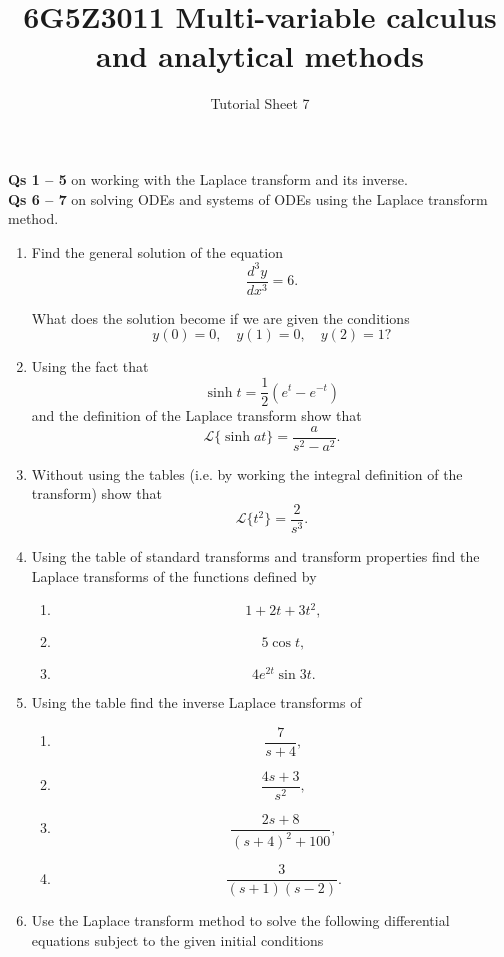 \documentclass[a4paper]{amsart}
\newcommand{\laplace}[1]{\mathcal{L}\{#1\}}
\begin{document}
\title{6G5Z3011 Multi-variable calculus and analytical methods}
\author{Tutorial Sheet 7}
\maketitle

\textbf{Qs 1 -- 5} on working with the Laplace transform and its inverse. \\
\textbf{Qs 6 -- 7} on solving ODEs and systems of ODEs using the Laplace transform method. 
\begin{enumerate}
    \item 
    Find the general solution of the equation
    $$ \frac{d^3y}{dx^3} = 6 .$$
    
    What does the solution become if we are given the conditions 
    $$y(0)=0, \quad y(1)=0, \quad y(2)=1 ?$$
    
    \item
    Using the fact that 
    $$ \sinh{t} = \frac{1}{2} \left ( e^t -e^{-t} \right ) $$
    and the definition of the Laplace transform show that
    $$\laplace{\sinh{at}}  = \frac{a}{s^2 - a^2} .$$
    
    \item
    Without using the tables (i.e. by working the integral definition of the transform) show that 
    $$ \laplace{ t^2 } = \dfrac{2}{s^3}.$$
    
    \item
    Using the table of standard transforms and transform properties find the Laplace transforms of the functions defined by
    \begin{enumerate}
    \item
    $$1 + 2t + 3t^2 ,$$
    \item
    $$5\cos{t} ,$$
    \item
    $$4e^{2t}\sin{3t} .$$
    \end{enumerate}
    
    \item
    Using the table find the inverse Laplace transforms of
    \begin{enumerate}
    \item
    $$\dfrac{7}{s+4} ,$$
    \item
    $$\dfrac{4s + 3}{s^2} ,$$
    \item
    $$\dfrac{2s+8}{(s+4)^2 + 100} ,$$
    \item
    $$\dfrac{3}{(s+1)(s-2)} .$$
    \end{enumerate}
    \item
Use the Laplace transform method to solve the following differential equations subject to the given initial conditions


\end{enumerate}
\end{document}
